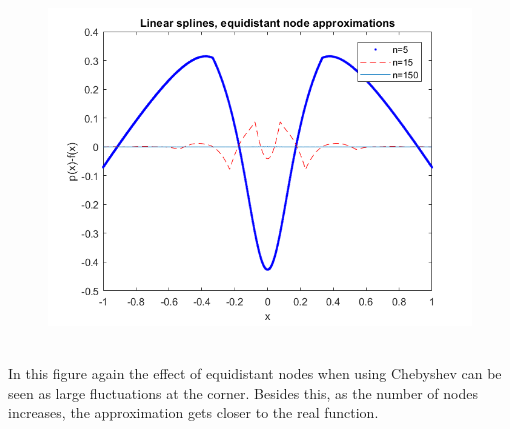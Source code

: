 \documentclass{article}
\begin{document}
\begin{figure}[h]
\begin{minipage}{0.56\textwidth}
	  \includegraphics[width = \textwidth, keepaspectratio]{splequi.png}
    \end{minipage}   	   
    \end{figure}\\
    In this figure again the effect of equidistant nodes when using Chebyshev can be seen as large fluctuations at the corner. Besides this, as the number of nodes increases, the approximation gets closer to the real function.\\
    \newpage
\end{document}
